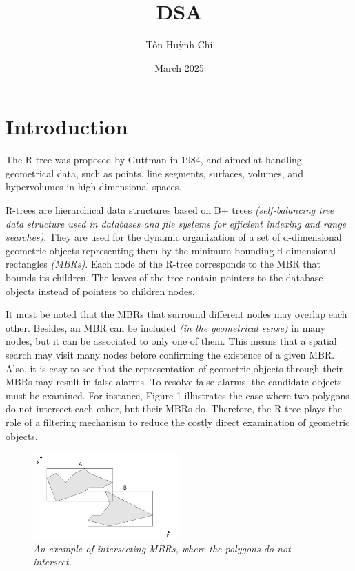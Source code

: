 \documentclass{article}
\title{DSA}
\author{Tôn Huỳnh Chí}
\date{March 2025}
\begin{document}
\maketitle

\section{Introduction} 

The R-tree was proposed by Guttman in 1984, and aimed at handling geometrical data, such as points, line segments, surfaces, volumes, and hypervolumes in high-dimensional spaces. \par
R-trees are hierarchical data structures based on B+ trees \textit{(self-balancing tree data structure used in databases and file systems for efficient indexing and range searches)}. They are used for the dynamic organization of a set of d-dimensional geometric objects representing them by the minimum bounding d-dimensional rectangles \textit{(MBRs)}. Each node of the R-tree corresponds to the MBR that bounds its children. The leaves of the tree contain pointers to the database objects instead of pointers to children nodes.\par
It must be noted that the MBRs that surround different nodes may overlap each other. Besides, an MBR can be included \textit{(in the geometrical sense)} in many nodes, but it can be associated to only one of them. This means that a spatial search may visit many nodes before confirming the existence of a given MBR. Also, it is easy to see that the representation of geometric objects through their MBRs may result in false alarms. To resolve false alarms, the candidate objects must be examined. For instance, Figure 1 illustrates the case where two polygons do not intersect each other, but their MBRs do. Therefore, the R-tree plays the role of a filtering mechanism to reduce the costly direct examination of geometric objects.

\begin{figure}[h]
\centering
\includegraphics[width=0.5\textwidth]{1.1.png}
\caption{\textit{An example of intersecting MBRs, where the polygons do not intersect.}}
\label{fig:1.1}
\end{figure}
\end{document}
